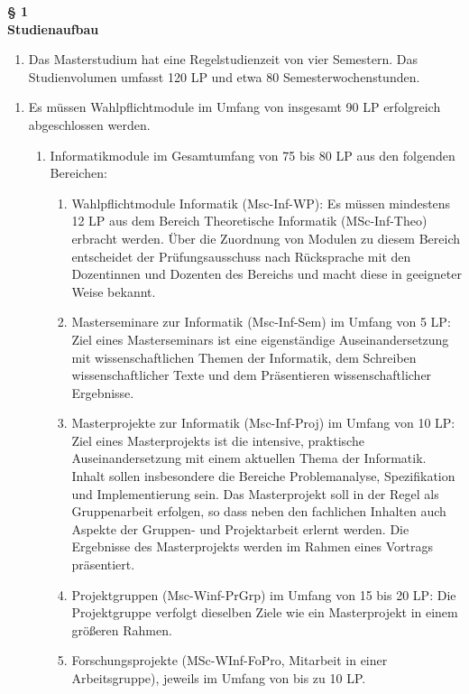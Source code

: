 \documentclass{article}\usepackage{helvet}\renewcommand{\familydefault}{\sfdefault}\usepackage[letterpaper,top=2cm,bottom=2cm,left=3cm,right=3cm,marginparwidth=1.75cm]{geometry}\usepackage[colorlinks=true,allcolors=red]{hyperref}\usepackage{enumitem}\usepackage{tabularx}\usepackage[T1]{fontenc}\usepackage[utf8]{inputenc}\usepackage{fancyhdr}\usepackage{lastpage}\pagestyle{fancy}\fancyhf{}
\begin{document}
	\hypertarget{label}{
	\begin{center}
		\textbf{§ 1\\Studienaufbau}
	\end{center}
}
	\begin{enumerate}[start=1,label=(\arabic*)]
		\item{Das Masterstudium hat eine Regelstudienzeit von vier Semestern. Das Studienvolumen umfasst 120 LP und etwa 80 Semesterwochenstunden.}
	\end{enumerate}

	\begin{enumerate}[start=2,label=(\arabic*)]
		\item{Es müssen Wahlpflichtmodule im Umfang von insgesamt 90 LP erfolgreich abgeschlossen werden.
		\begin{enumerate}[label=\arabic*.]
			\item{Informatikmodule im Gesamtumfang von 75 bis 80 LP aus den folgenden Bereichen:
			\begin{enumerate}[label=\alph*)]
				\item{Wahlpflichtmodule Informatik (Msc-Inf-WP): Es müssen mindestens 12 LP aus dem Bereich Theoretische Informatik (MSc-Inf-Theo) erbracht werden. Über die Zuordnung von Modulen zu diesem Bereich entscheidet der Prüfungsausschuss nach Rücksprache mit den Dozentinnen und Dozenten des Bereichs und macht diese in geeigneter Weise bekannt.}
				\item{\hypertarget{numb}{}Masterseminare zur Informatik (Msc-Inf-Sem) im Umfang von 5 LP: Ziel eines Masterseminars ist eine eigenständige Auseinandersetzung mit wissenschaftlichen Themen der Informatik, dem Schreiben wissenschaftlicher Texte und dem Präsentieren wissenschaftlicher Ergebnisse.}
				\item{Masterprojekte zur Informatik (Msc-Inf-Proj) im Umfang von 10 LP: Ziel eines Masterprojekts ist die intensive, praktische Auseinandersetzung mit einem aktuellen Thema der Informatik. Inhalt sollen insbesondere die Bereiche Problemanalyse, Spezifikation und Implementierung sein. Das Masterprojekt soll in der Regel als Gruppenarbeit erfolgen, so dass neben den fachlichen Inhalten auch Aspekte der Gruppen- und Projektarbeit erlernt werden. Die Ergebnisse des Masterprojekts werden im Rahmen eines Vortrags präsentiert.}
				\item{Projektgruppen (Msc-Winf-PrGrp) im Umfang von 15 bis 20 LP: Die Projektgruppe verfolgt dieselben Ziele wie ein Masterprojekt in einem größeren Rahmen.}
				\item{\hypertarget{nume}{}Forschungsprojekte (MSc-WInf-FoPro, Mitarbeit in einer Arbeitsgruppe), jeweils im Umfang von bis zu 10 LP.}

\end{enumerate}}
\end{enumerate}}
\end{enumerate}
\end{document}
